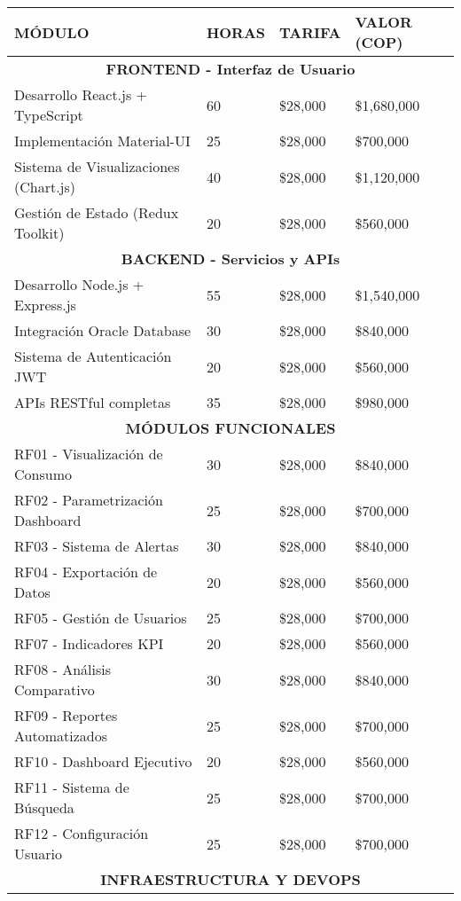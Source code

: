 \documentclass[12pt,a4paper]{article}
\begin{document}
\begin{longtable}{|p{5.5cm}|p{1.8cm}|p{1.8cm}|p{2.5cm}|}
\hline
\rowcolor{headerblue}
\textbf{\color{white}MÓDULO} & \textbf{\color{white}HORAS} & \textbf{\color{white}TARIFA} & \textbf{\color{white}VALOR (COP)} \\
\hline
\endhead

\multicolumn{4}{c}{\textbf{FRONTEND - Interfaz de Usuario}} \\
\hline
Desarrollo React.js + TypeScript & 60 & \$28,000 & \$1,680,000 \\
Implementación Material-UI & 25 & \$28,000 & \$700,000 \\
Sistema de Visualizaciones (Chart.js) & 40 & \$28,000 & \$1,120,000 \\
Gestión de Estado (Redux Toolkit) & 20 & \$28,000 & \$560,000 \\
\hline
\multicolumn{4}{c}{\textbf{BACKEND - Servicios y APIs}} \\
\hline
Desarrollo Node.js + Express.js & 55 & \$28,000 & \$1,540,000 \\
Integración Oracle Database & 30 & \$28,000 & \$840,000 \\
Sistema de Autenticación JWT & 20 & \$28,000 & \$560,000 \\
APIs RESTful completas & 35 & \$28,000 & \$980,000 \\
\hline
\multicolumn{4}{c}{\textbf{MÓDULOS FUNCIONALES}} \\
\hline
RF01 - Visualización de Consumo & 30 & \$28,000 & \$840,000 \\
RF02 - Parametrización Dashboard & 25 & \$28,000 & \$700,000 \\
RF03 - Sistema de Alertas & 30 & \$28,000 & \$840,000 \\
RF04 - Exportación de Datos & 20 & \$28,000 & \$560,000 \\
RF05 - Gestión de Usuarios & 25 & \$28,000 & \$700,000 \\
RF07 - Indicadores KPI & 20 & \$28,000 & \$560,000 \\
RF08 - Análisis Comparativo & 30 & \$28,000 & \$840,000 \\
RF09 - Reportes Automatizados & 25 & \$28,000 & \$700,000 \\
RF10 - Dashboard Ejecutivo & 20 & \$28,000 & \$560,000 \\
RF11 - Sistema de Búsqueda & 25 & \$28,000 & \$700,000 \\
RF12 - Configuración Usuario & 25 & \$28,000 & \$700,000 \\
\hline
\multicolumn{4}{c}{\textbf{INFRAESTRUCTURA Y DEVOPS}} \\

\end{longtable}
\end{document}
